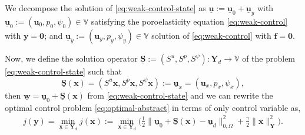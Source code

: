 \documentclass[smallextended]{svjour3}
\numberwithin{equation}{section}
\numberwithin{figure}{section}
\numberwithin{table}{section}
\newcommand{\buS}{\underline{\boldsymbol{S}}}
\newcommand\cero{{\boldsymbol{0}}}
\newcommand\bV{\mathbf{V}}
\newcommand\ff{\boldsymbol{f}}
\newcommand\buu{\underline{\boldsymbol{u}}}
\newcommand\buv{\underline{\boldsymbol{v}}}
\newcommand\buw{\underline{\boldsymbol{w}}}
\newcommand\bx{\boldsymbol{x}}
\newcommand\by{\boldsymbol{y}}
\newcommand\bu{\boldsymbol{u}}
\newcommand{\bYd}{\boldsymbol{Y}_d}
\newcommand{\bY}{\boldsymbol{Y}}
\newcommand{\bbV}{\mathbb{V}}
\newcommand{\bbR}{\mathbb{R}}
\begin{document}

We decompose the solution of \eqref{eq:weak-control-state} as $\buu:= \buu_{0}+ \buu_y$ with $\buu_0:=(\bu_0, p_0, \psi_0) \in \bbV$ satisfying the poroelasticity equation \eqref{eq:weak-control} with $\by=\cero$; and  $\buu_y:=(\bu_y, p_y, \psi_y) \in \bbV$ solution of \eqref{eq:weak-control} with $\ff=\cero$.

Now, we define the solution operator $\buS:=(S^u, S^p, S^\psi):\bYd \to \bbV $ of the problem \eqref{eq:weak-control-state} such that 
$$\buS (\bx) = (S^u \bx, S^p \bx, S^{\psi} \bx) :=\buu_x=(\bu_x, p_x, \psi_x),$$ then $\buw=\buu_0 + \buS (\bx)$ from \eqref{eq:weak-control-state} and
we can rewrite the optimal control problem \eqref{eq:optimal-abstract} in terms of only control variable as,
\begin{align} \label{eq:optimalproblem}
	j(\by)= \min_{\bx \in \bYd} j(\bx) := \min_{\bx \in \bYd} \Big(\frac{1}{2} \| \buu_0 + \buS (\bx) - \buu_d \|_{0, \Omega}^2
	+ \frac{\gamma}{2} \| \bx \|_{\bY}^2 \Big).
\end{align}


\end{document}
